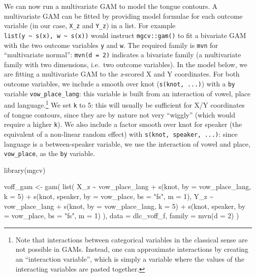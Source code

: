 \documentclass[
  man,
  longtable,
  nolmodern,
  notxfonts,
  notimes,
  colorlinks=true,linkcolor=blue,citecolor=blue,urlcolor=blue]{apa7}
\newenvironment{Shaded}{\begin{snugshade}}{\end{snugshade}}
\newcommand{\AttributeTok}[1]{\textcolor[rgb]{0.40,0.45,0.13}{#1}}
\newcommand{\DecValTok}[1]{\textcolor[rgb]{0.68,0.00,0.00}{#1}}
\newcommand{\FunctionTok}[1]{\textcolor[rgb]{0.28,0.35,0.67}{#1}}
\newcommand{\NormalTok}[1]{\textcolor[rgb]{0.00,0.23,0.31}{#1}}
\newcommand{\OtherTok}[1]{\textcolor[rgb]{0.00,0.23,0.31}{#1}}
\newcommand{\SpecialCharTok}[1]{\textcolor[rgb]{0.37,0.37,0.37}{#1}}
\newcommand{\StringTok}[1]{\textcolor[rgb]{0.13,0.47,0.30}{#1}}
\begin{document}
We can now run a multivariate GAM to model the tongue contours. A
multivariate GAM can be fitted by providing model formulae for each
outcome variable (in our case, \texttt{X\_z} and \texttt{Y\_z}) in a
list. For example
\texttt{list(y\ \textasciitilde{}\ s(x),\ w\ \textasciitilde{}\ s(x))}
would instruct \texttt{mgcv::gam()} to fit a bivariate GAM with the two
outcome variables \texttt{y} and \texttt{w}. The required family is
\texttt{mvn} for ``multivariate normal'': \texttt{mvn(d\ =\ 2)}
indicates a bivariate family (a multivariate family with two dimensions,
i.e.~two outcome variables). In the model below, we are fitting a
multivariate GAM to the \emph{z}-scored X and Y coordinates. For both
outcome variables, we include a smooth over knot
(\texttt{s(knot,\ ...)}) with a \texttt{by} variable
\texttt{vow\_place\_lang}: this variable is built from an interaction of
vowel, place and language.\footnote{Note that interactions between
  categorical variables in the classical sense are not possible in GAMs.
  Instead, one can approximate interactions by creating an ``interaction
  variable'', which is simply a variable where the values of the
  interacting variables are pasted together.} We set \texttt{k} to 5:
this will usually be sufficient for X/Y coordinates of tongue contours,
since they are by nature not very ``wiggly'' (which would require a
higher \texttt{k}). We also include a factor smooth over knot for
speaker (the equivalent of a non-linear random effect) with
\texttt{s(knot,\ speaker,\ ...)}: since language is a between-speaker
variable, we use the interaction of vowel and place,
\texttt{vow\_place}, as the \texttt{by} variable.

\begin{Shaded}
\begin{Highlighting}[]
\FunctionTok{library}\NormalTok{(mgcv)}

\NormalTok{voff\_gam }\OtherTok{\textless{}{-}} \FunctionTok{gam}\NormalTok{(}
  \FunctionTok{list}\NormalTok{(}
\NormalTok{    X\_z }\SpecialCharTok{\textasciitilde{}}\NormalTok{ vow\_place\_lang }\SpecialCharTok{+}
      \FunctionTok{s}\NormalTok{(knot, }\AttributeTok{by =}\NormalTok{ vow\_place\_lang, }\AttributeTok{k =} \DecValTok{5}\NormalTok{) }\SpecialCharTok{+}
      \FunctionTok{s}\NormalTok{(knot, speaker, }\AttributeTok{by =}\NormalTok{ vow\_place, }\AttributeTok{bs =} \StringTok{"fs"}\NormalTok{, }\AttributeTok{m =} \DecValTok{1}\NormalTok{),}
\NormalTok{    Y\_z }\SpecialCharTok{\textasciitilde{}}\NormalTok{ vow\_place\_lang }\SpecialCharTok{+}
      \FunctionTok{s}\NormalTok{(knot, }\AttributeTok{by =}\NormalTok{ vow\_place\_lang, }\AttributeTok{k =} \DecValTok{5}\NormalTok{) }\SpecialCharTok{+}
      \FunctionTok{s}\NormalTok{(knot, speaker, }\AttributeTok{by =}\NormalTok{ vow\_place, }\AttributeTok{bs =} \StringTok{"fs"}\NormalTok{, }\AttributeTok{m =} \DecValTok{1}\NormalTok{)}
\NormalTok{  ),}
  \AttributeTok{data =}\NormalTok{ dlc\_voff\_f,}
  \AttributeTok{family =} \FunctionTok{mvn}\NormalTok{(}\AttributeTok{d =} \DecValTok{2}\NormalTok{)}
\NormalTok{)}
\end{Highlighting}
\end{Shaded}
\end{document}
